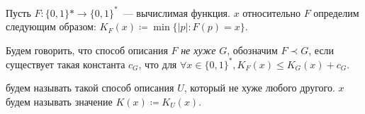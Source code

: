 






\begin{definition*}
    Пусть $F: \{0, 1\}* \to \{0, 1\}^*$~--- вычислимая функция.  $x$
    относительно $F$ определим следующим образом: $K_F(x) \coloneqq \min\{|p| : F(p) = x\}$.

    Будем говорить, что способ описания $F$ \textit{не хуже} $G$, обозначим $F \prec G$, если существует
    такая константа $c_G$, что для $\forall x \in \{0, 1\}^*, K_F(x) \le K_G(x) +
    c_G$.

     будем называть такой способ описания $U$, который не хуже любого
    другого.  $x$ будем называть значение $K(x) \coloneqq K_U(x)$.
\end{definition*}


\breakline












